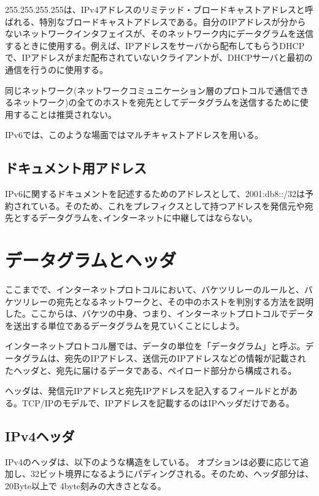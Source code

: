255.255.255.255は、IPv4アドレスのリミテッド・ブロードキャストアドレスと呼ばれる、特別なブロードキャストアドレスである。自分のIPアドレスが分からないネットワークインタフェイスが、そのネットワーク内にデータグラムを送信するときに使用する。例えば、IPアドレスをサーバから配布してもらうDHCPで、IPアドレスがまだ配布されていないクライアントが、DHCPサーバと最初の通信を行うのに使用する。

同じネットワーク(ネットワークコミュニケーション層のプロトコルで通信できるネットワーク)の全てのホストを宛先としてデータグラムを送信するために使用することは推奨されない。

IPv6では、このような場面ではマルチキャストアドレスを用いる。


\subsection{ドキュメント用アドレス}
IPv6に関するドキュメントを記述するためのアドレスとして、2001:db8::/32は予約されている。そのため、これをプレフィクスとして持つアドレスを発信元や宛先とするデータグラムを､インターネットに中継してはならない。







\section{データグラムとヘッダ}

ここまでで、インターネットプロトコルにおいて、バケツリレーのルールと、バケツリレーの宛先となるネットワークと、その中のホストを判別する方法を説明した。ここからは、バケツの中身、つまり、インターネットプロトコルでデータを送出する単位であるデータグラムを見ていくことにしよう。

インターネットプロトコル層では、データの単位を「データグラム」と呼ぶ。データグラムは、宛先のIPアドレス、送信元のIPアドレスなどの情報が記載されたヘッダと、宛先に届けるデータである、ペイロード部分から構成される。

ヘッダは、発信元IPアドレスと宛先IPアドレスを記入するフィールドとがある。TCP/IPのモデルで、IPアドレスを記載するのはIPヘッダだけである。

\subsection{IPv4ヘッダ}
IPv4のヘッダは、以下のような構造をしている。
オプションは必要に応じて追加し、32ビット境界になるようにパディングされる。そのため、ヘッダ部分は、20Byte以上で 4byte刻みの大きさとなる。

